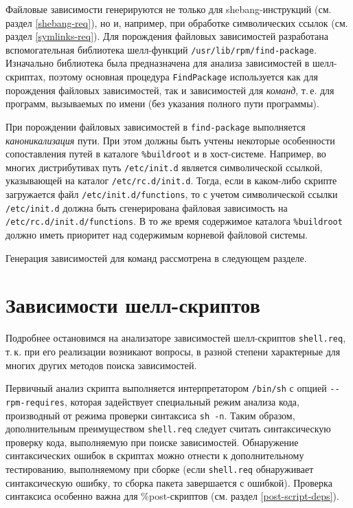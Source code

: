 \documentclass[russian,a4paper,12pt,titlepage]{article}
\begin{document}
Файловые зависимости генерируются не только для shebang-инструкций (см. раздел \ref{shebang-req}),
но и, например, при обработке символических ссылок (см. раздел \ref{symlinks-req}).  Для порождения
файловых зависимостей разработана вспомогательная библиотека шелл-функций \verb|/usr/lib/rpm/find-package|.
Изначально библиотека была предназначена для анализа зависимостей в шелл-скриптах, поэтому основная процедура
\verb|FindPackage| используется как для порождения файловых зависимостей, так и зависимостей
для \textit{команд}, т.\,е. для программ, вызываемых по имени (без указания полного пути программы).

При порождении файловых зависимостей в \verb|find-package| выполняется \textit{каноникализация} пути.
При этом должны быть учтены некоторые особенности сопоставления путей в каталоге \verb|%buildroot|
и в хост-системе.  Например, во многих дистрибутивах путь \verb|/etc/init.d| является символической
ссылкой, указывающей на каталог \verb|/etc/rc.d/init.d|.  Тогда, если в каком-либо скрипте загружается
файл \verb|/etc/init.d/functions|, то с учетом символической ссылки \verb|/etc/init.d|
должна быть сгенерирована файловая зависимость на \verb|/etc/rc.d/init.d/functions|.
В то же время содержимое каталога \verb|%buildroot| должно иметь приоритет над
содержимым корневой файловой системы.

Генерация зависимостей для команд рассмотрена в следующем разделе.

\section{Зависимости шелл-скриптов}
\label{shell-req}
Подробнее остановимся на анализаторе зависимостей шелл-скриптов \verb|shell.req|, т.\,к. при
его реализации возникают вопросы, в разной степени характерные для многих других методов
поиска зависимостей.

Первичный анализ скрипта выполняется интерпретатором \verb|/bin/sh| с опцией \verb|--rpm-requires|,
которая задействует специальный режим анализа кода, производный от режима проверки синтаксиса \verb|sh -n|.
Таким образом, дополнительным преимуществом \verb|shell.req| следует считать синтаксическую проверку
кода, выполняемую при поиске зависимостей.  Обнаружение синтаксических ошибок в скриптах можно отнести
к дополнительному тестированию, выполняемому при сборке (если \verb|shell.req| обнаруживает синтаксическую ошибку,
то сборка пакета завершается с ошибкой).  Проверка синтаксиса особенно важна для \%post-скриптов (см. раздел
\ref{post-script-deps}).
\end{document}
